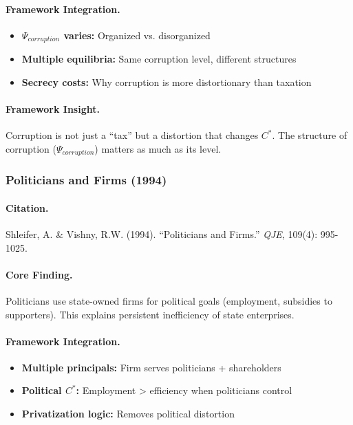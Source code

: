 \paragraph{Framework Integration.}
\begin{itemize}
  \item \textbf{$\Psi_{corruption}$ varies:} Organized vs. disorganized
  \item \textbf{Multiple equilibria:} Same corruption level, different structures
  \item \textbf{Secrecy costs:} Why corruption is more distortionary than taxation
\end{itemize}

\paragraph{Framework Insight.}
Corruption is not just a ``tax'' but a distortion that changes $C^*$.
The structure of corruption ($\Psi_{corruption}$) matters as much as its level.

\subsubsection{Politicians and Firms (1994)}

\paragraph{Citation.}
Shleifer, A. \& Vishny, R.W. (1994).
``Politicians and Firms.'' \emph{QJE}, 109(4): 995-1025.

\paragraph{Core Finding.}
Politicians use state-owned firms for political goals (employment, subsidies
to supporters). This explains persistent inefficiency of state enterprises.

\paragraph{Framework Integration.}
\begin{itemize}
  \item \textbf{Multiple principals:} Firm serves politicians + shareholders
  \item \textbf{Political $C^*$:} Employment > efficiency when politicians control
  \item \textbf{Privatization logic:} Removes political distortion
\end{itemize}

